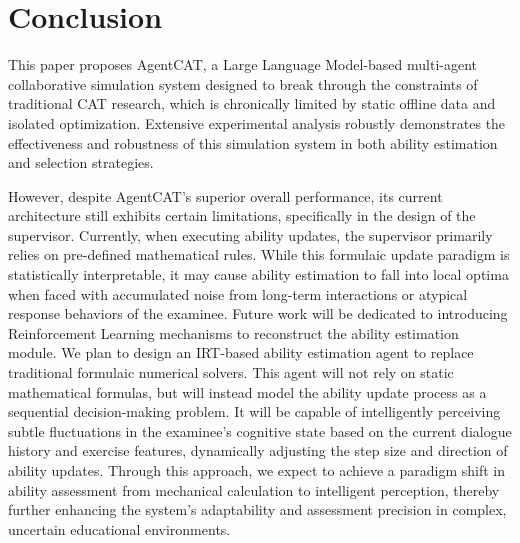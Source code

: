 \section{Conclusion}
This paper proposes AgentCAT, a Large Language Model-based multi-agent collaborative simulation system designed to break through the constraints of traditional CAT research, which is chronically limited by static offline data and isolated optimization. Extensive experimental analysis robustly demonstrates the effectiveness and robustness of this simulation system in both ability estimation and selection strategies.
 
However, despite AgentCAT's superior overall performance, its current architecture still exhibits certain limitations, specifically in the design of the supervisor. Currently, when executing ability updates, the supervisor primarily relies on pre-defined mathematical rules. While this formulaic update paradigm is statistically interpretable, it may cause ability estimation to fall into local optima when faced with accumulated noise from long-term interactions or atypical response behaviors of the examinee. Future work will be dedicated to introducing Reinforcement Learning mechanisms to reconstruct the ability estimation module. We plan to design an IRT-based ability estimation agent to replace traditional formulaic numerical solvers. This agent will not rely on static mathematical formulas, but will instead model the ability update process as a sequential decision-making problem. It will be capable of intelligently perceiving subtle fluctuations in the examinee's cognitive state based on the current dialogue history and exercise features, dynamically adjusting the step size and direction of ability updates. Through this approach, we expect to achieve a paradigm shift in ability assessment from mechanical calculation to intelligent perception, thereby further enhancing the system's adaptability and assessment precision in complex, uncertain educational environments.